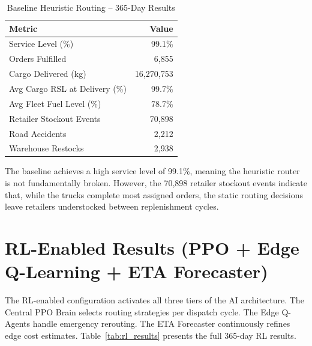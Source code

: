 \begin{table}[h!]
\centering
\caption{Baseline Heuristic Routing -- 365-Day Results}
\label{tab:baseline}
\begin{tabular}{|l|r|}
\hline
\textbf{Metric}                     & \textbf{Value} \\
\hline
Service Level (\%)                  & 99.1\%         \\
\hline
Orders Fulfilled                    & 6,855          \\
\hline
Cargo Delivered (kg)                & 16,270,753     \\
\hline
Avg Cargo RSL at Delivery (\%)      & 99.7\%         \\
\hline
Avg Fleet Fuel Level (\%)           & 78.7\%         \\
\hline
Retailer Stockout Events            & 70,898         \\
\hline
Road Accidents                      & 2,212          \\
\hline
Warehouse Restocks                  & 2,938          \\
\hline
\end{tabular}
\end{table}

The baseline achieves a high service level of 99.1\%, meaning the heuristic router
is not fundamentally broken. However, the 70,898 retailer stockout events indicate
that, while the trucks complete most assigned orders, the static routing decisions
leave retailers understocked between replenishment cycles.

\section{RL-Enabled Results (PPO + Edge Q-Learning + ETA Forecaster)}

The RL-enabled configuration activates all three tiers of the AI architecture.
The Central PPO Brain selects routing strategies per dispatch cycle. The Edge
Q-Agents handle emergency rerouting. The ETA Forecaster continuously refines edge
cost estimates. Table~\ref{tab:rl_results} presents the full 365-day RL results.

